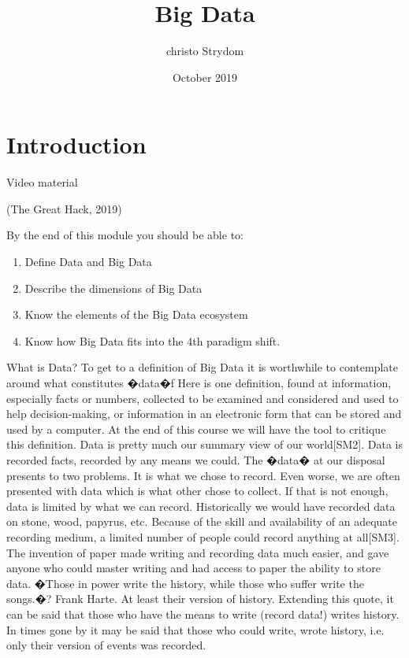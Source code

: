 \documentclass{book}
\title{Big Data}
\author{christo Strydom}
\date{October 2019}
\begin{document}
\maketitle

\chapter{Introduction}

Video material

(The Great Hack, 2019)

By the end of this module you should be able to:
\begin{enumerate}
	\item Define Data and Big Data
	\item Describe the dimensions of Big Data
	\item Know the elements of the Big Data ecosystem
	\item Know how Big Data fits into the 4th paradigm shift.
\end{enumerate}
What is Data?
To get to a definition of Big Data it is worthwhile to contemplate around what constitutes �data�f  Here is one definition, found at  \cite{Ach89}
information, especially facts or numbers, collected to be examined and considered and used to help decision-making, or information in an electronic form that can be stored and used by a computer.
At the end of this course we will have the tool to critique this definition.  Data is pretty much our summary view of our world[SM2].  Data is recorded facts, recorded by any means we could.  The �data� at our disposal presents to two problems.  It is what we chose to record.  Even worse, we are often presented with data which is what other chose to collect.  If that is not enough, data is limited by what we can record.  Historically we would have recorded data on stone, wood, papyrus, etc.  Because of the skill and availability of an adequate recording medium, a limited number of people could record anything at all[SM3].  The invention of paper made writing and recording data much easier, and gave anyone who could master writing and had access to paper the ability to store data.  �Those in power write the history, while those who suffer write the songs.�? Frank Harte.  At least their version of history.  Extending this quote, it can be said that those who have the means to write (record data!) writes history.  In times gone by it may be said that those who could write, wrote history, i.e. only their version of events was recorded. 
\end{document}
